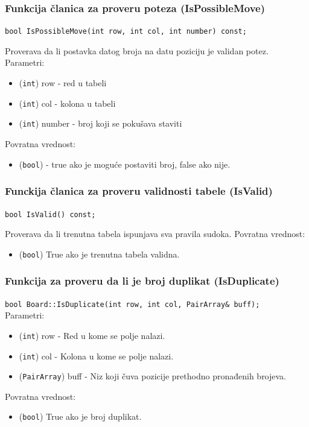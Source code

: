 \documentclass[a4paper]{article}
\begin{document}
    \subsubsection{Funkcija članica za proveru poteza (IsPossibleMove)}
    \texttt{bool IsPossibleMove(int row, int col, int number) const;}
    \par Proverava da li postavka datog broja na datu poziciju je validan potez.
    Parametri:
    \begin{itemize}
        \item (\texttt{int}) row - red u tabeli
        \item (\texttt{int}) col - kolona u tabeli
        \item (\texttt{int}) number - broj koji se pokušava staviti
    \end{itemize}
    Povratna vrednost:
    \begin{itemize}
        \item (\texttt{bool}) - true ako je moguće postaviti broj, false ako nije.
    \end{itemize}

    \subsubsection{Funckija članica za proveru validnosti tabele (IsValid)}
    \texttt{bool IsValid() const;}
    \par Proverava da li trenutna tabela ispunjava sva pravila sudoka.
    Povratna vrednost:
    \begin{itemize}
        \item (\texttt{bool}) True ako je trenutna tabela validna.
    \end{itemize}

    \subsubsection{Funkcija za proveru da li je broj duplikat (IsDuplicate)}
    \texttt{bool Board::IsDuplicate(int row, int col, PairArray\& buff);}\\
    Parametri:
    \begin{itemize}
        \item (\texttt{int}) row - Red u kome se polje nalazi.
        \item (\texttt{int}) col - Kolona u kome se polje nalazi.
        \item (\texttt{PairArray}) buff - Niz koji čuva pozicije prethodno pronađenih brojeva.
    \end{itemize}
    Povratna vrednost:
    \begin{itemize}
        \item (\texttt{bool}) True ako je broj duplikat.
    \end{itemize}
\end{document}
